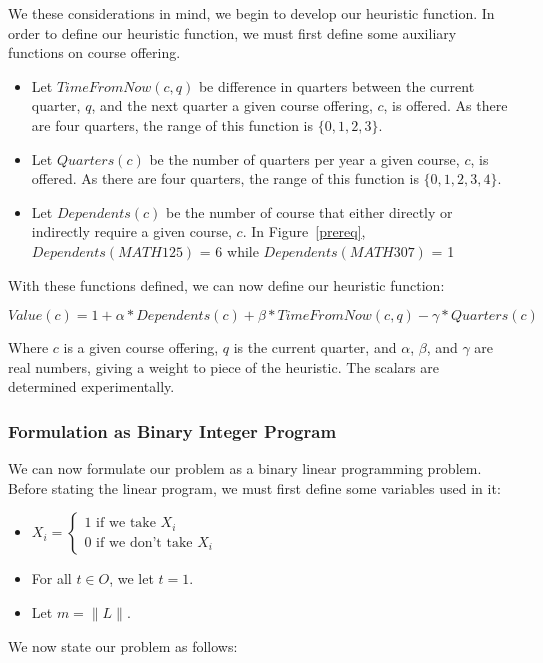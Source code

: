 \documentclass[11pt]{article} %
\begin{document}
We these considerations in mind, we begin to develop our heuristic function. In
order to define our heuristic function, we must first define some auxiliary
functions on course offering.  \begin{itemize} \item Let $TimeFromNow(c, q)$ be
difference in quarters between the current quarter, $q$, and the next quarter
a given course offering, $c$, is offered. As there are four quarters, the range
of this function is $\{0, 1, 2, 3\}$.  \item Let $Quarters(c)$ be the number of
quarters per year a given course, $c$, is offered. As there are four quarters,
the range of this function is $\{0, 1, 2, 3, 4\}$.  \item Let $Dependents(c)$ be
the number of course that either directly or indirectly require a given course,
$c$. In Figure~\ref{prereq}, $Dependents(MATH125)$ = 6 while
$Dependents(MATH307)$ = 1 \end{itemize}

With these functions defined, we can now define our heuristic function:

\begin{equation} 
    Value(c) = 1 + \alpha * Dependents(c) + \beta * TimeFromNow(c,q) 
    - \gamma * Quarters(c)
    \label{value_func}
\end{equation} 

Where $c$ is a given course offering,
$q$ is the current quarter, and $\alpha$, $\beta$, and $\gamma$ are real
numbers, giving a weight to piece of the heuristic. The scalars are determined
experimentally.

\subsubsection{Formulation as Binary Integer Program} We can now formulate our
problem as a binary linear programming problem. Before stating the linear
program, we must first define some variables used in it: \\ \begin{itemize}
\item $ X_i = \left\{ \begin{array}{lr} 1 \text{ if we take } X_i\\ 0 \text{ if
we don't take } X_i \end{array} \right. $ \item For all $t \in O$, we let $t
= 1$.  \item Let $m = \|L\|$.  \end{itemize} We now state our problem as
follows:
\end{document}
